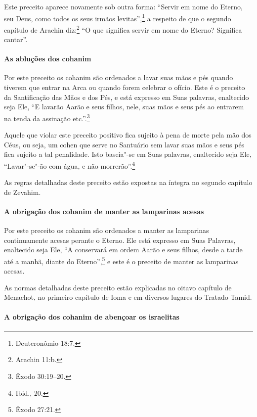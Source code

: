 \begin{multicols}{2}
Este preceito aparece novamente sob outra forma: ``Servir em nome do
Eterno, seu Deus, como todos os seus irmãos levitas\starr{}'',\footnote{Deuteronômio
18:7.} a respeito de que o segundo capítulo de Arachin\star{}
diz:\footnote{Arachin 11:b.} ``O que significa servir em nome do Eterno?
Significa cantar''.

\paragraph{As abluções dos cohanim\starr{}}

Por este preceito os cohanim\starr{} são ordenados a lavar suas mãos e pés
quando tiverem que entrar na Arca ou quando forem celebrar o ofício.
Este é o preceito da Santificação das Mãos e dos Pés, e está expresso em
Suas palavras, enaltecido seja Ele, ``E lavarão Aarão e seus filhos,
nele, suas mãos e seus pés ao entrarem na tenda da assinação etc.''.\footnote{Êxodo 30:19--20.}

Aquele que violar este preceito positivo fica sujeito à pena de morte
pela mäo dos Céus, ou seja, um cohen\starr{} que serve no Santuário sem
lavar suas mãos e seus pés fica sujeito a tal penalidade. Isto baseia"-se
em Suas palavras, enaltecido seja Ele, ``Lavar"-se"-ão com água, e não
morrerão''.\footnote{Ibid., 20.}

As regras detalhadas deste preceito estão expostas na íntegra no segundo
capítulo de Zevahim\starr.

\paragraph{A obrigação dos cohanim\starr{} de manter as lamparinas acesas}

Por este preceito os cohanim\starr{} são ordenados a manter as lamparinas
continuamente acesas perante o Eterno. Ele está expresso em Suas
Palavras, enaltecido seja Ele, ``A conservará em ordem Aarão e seus
filhos, desde a tarde até a manhã, diante do Eterno'',\footnote{Êxodo 27:21.} e
este é o preceito de manter as lamparinas acesas.

As normas detalhadas deste preceito estão explicadas no oitavo capítulo
de Menachot\starr, no primeiro capítulo de Ioma\starr{} e em diversos lugares do
Tratado Tamid\starr.

\paragraph{A obrigação dos cohanim\starr{} de abençoar os israelitas}


\end{multicols}
